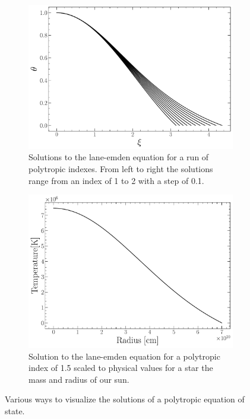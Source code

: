 \begin{figure}[htbp]
  \centering
  \begin{subfigure}[t]{0.45\textwidth}
    \centering
    \includegraphics[width=\textwidth]{figures/introduction/runofp.pdf}
    \caption{Solutions to the lane-emden equation for a run of polytropic
    indexes. From left to right the solutions range from an index of 1 to 2
    with a step of 0.1.}
    \label{fig:runofp}
  \end{subfigure}
  \begin{subfigure}[t]{0.45\textwidth}
      \centering
      \includegraphics[width=\textwidth]{figures/introduction/PolytropeTempProfile15.pdf}
      \caption{Solution to the lane-emden equation for a polytropic index of 1.5 scaled to
      physical values for a star the mass and radius of our sun.}
      \label{fig:polyScaled}
  \end{subfigure}
  \caption{Various ways to visualize the solutions of a polytropic equation of state.}
  \label{fig:starsInHistory}
\end{figure}


